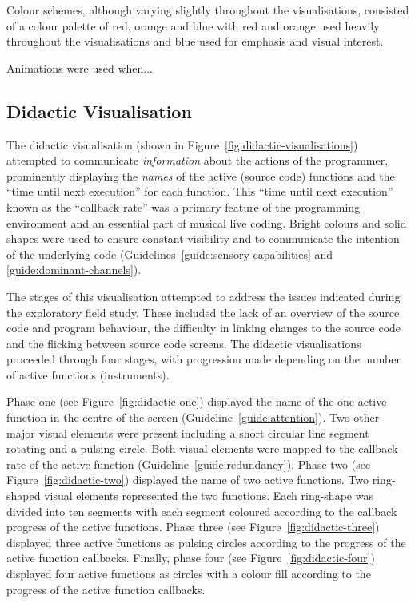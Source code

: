 Colour schemes, although varying slightly throughout the visualisations, consisted of a colour palette of red, orange and blue with red and orange used heavily throughout the visualisations and blue used for emphasis and visual interest.

Animations were used when... \more

\subsection{Didactic Visualisation}
\label{sec:didactic-visualisation}



The didactic visualisation (shown in Figure~\ref{fig:didactic-visualisations}) attempted to communicate \emph{information} about the actions of the programmer, prominently displaying the \emph{names} of the active (source code) functions and the ``time until next execution'' for each function. This ``time until next execution'' known as the ``callback rate'' was a primary feature of the programming environment and an essential part of musical live coding. Bright colours and solid shapes were used to ensure constant visibility and to communicate the intention of the underlying code (Guidelines~\ref{guide:sensory-capabilities} and \ref{guide:dominant-channels}). 

The stages of this visualisation attempted to address the issues indicated during the exploratory field study. These included the lack of an overview of the source code and program behaviour, the difficulty in linking changes to the source code and the flicking between source code screens. The didactic visualisations proceeded through four stages, with progression made depending on the number of active functions (instruments).

Phase one (see Figure~\ref{fig:didactic-one}) displayed the name of the one active function in the centre of the screen (Guideline~\ref{guide:attention}). Two other major visual elements were present including a short circular line segment rotating and a pulsing circle. Both visual elements were mapped to the callback rate of the active function (Guideline~\ref{guide:redundancy}). Phase two (see Figure~\ref{fig:didactic-two}) displayed the name of two active functions. Two ring-shaped visual elements represented the two functions. Each ring-shape was divided into ten segments with each segment coloured according to the callback progress of the active functions. Phase three (see Figure~\ref{fig:didactic-three}) displayed three active functions as pulsing circles according to the progress of the active function callbacks. Finally, phase four (see Figure~\ref{fig:didactic-four}) displayed four active functions as circles with a colour fill according to the progress of the active function callbacks.

